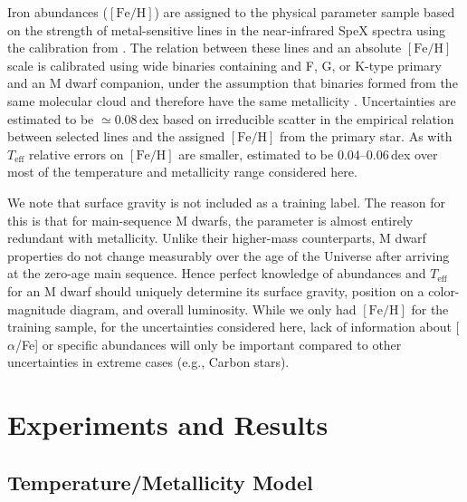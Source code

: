 \documentclass[twocolumn]{aastex62}
\newcommand{\teff}{T_{\mathrm{eff}}}
\newcommand{\feh}{[{\mathrm{Fe}/\mathrm{H}}]}
\begin{document}
Iron abundances ($\feh$) are assigned to the physical parameter sample based on the strength of metal-sensitive lines in the near-infrared SpeX spectra \citep{RojasAyala:2010} using the calibration from \citet{Mann:2013a}. The relation between these lines and an absolute $\feh$ scale is calibrated using wide binaries containing and F, G, or K-type primary and an M dwarf companion, under the assumption that binaries formed from the same molecular cloud and therefore have the same metallicity \citep{Bonfils:2005}. Uncertainties are estimated to be $\simeq$0.08\,dex based on irreducible scatter in the empirical relation between selected lines and the assigned $\feh$ from the primary star. As with $\teff$ relative errors on $\feh$ are smaller, estimated to be 0.04--0.06\,dex over most of the temperature and metallicity range considered here.

We note that surface gravity is not included as a training label. The reason for this is that for main-sequence M dwarfs, the parameter is almost entirely redundant with metallicity. Unlike their higher-mass counterparts, M dwarf properties do not change measurably over the age of the Universe after arriving at the zero-age main sequence. Hence perfect knowledge of abundances and $\teff$ for an M dwarf should uniquely determine its surface gravity, position on a color-magnitude diagram, and overall luminosity. While we only had $\feh$ for the training sample, for the uncertainties considered here, lack of information about [$\alpha$/Fe] or specific abundances will only be important compared to other uncertainties in extreme cases (e.g., Carbon stars).  \\


\section{Experiments and Results} \label{sec:results}

\subsection{Temperature/Metallicity Model \label{subsec:mann_results}}
\end{document}
